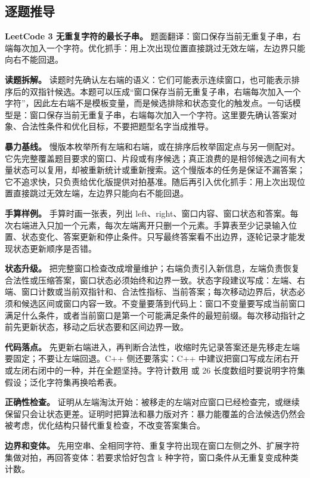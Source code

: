 \subsection{逐题推导}

\noindent\textbf{LeetCode 3 无重复字符的最长子串。} 题面翻译：窗口保存当前无重复子串，右端每次加入一个字符。优化抓手：用上次出现位置直接跳过无效左端，左边界只能向右不能回退。

\textbf{读题拆解。} 读题时先确认左右端的语义：它们可能表示连续窗口，也可能表示排序后的双指针候选。本题可以压成“窗口保存当前无重复子串，右端每次加入一个字符”，因此左右端不是模板变量，而是候选排除和状态变化的触发点。一句话模型是：窗口保存当前无重复子串，右端每次加入一个字符。这里要先确认答案对象、合法性条件和优化目标，不要把题型名字当成推导。

\textbf{暴力基线。} 慢版本枚举所有左端和右端，或在排序后枚举固定点与另一侧配对。它先完整覆盖题目要求的窗口、片段或有序候选；真正浪费的是相邻候选之间有大量状态可以复用，却被重新统计或重新搜索。这个慢版本的任务是保证不漏答案；它不追求快，只负责给优化版提供对拍基准。随后再引入优化抓手：用上次出现位置直接跳过无效左端，左边界只能向右不能回退。

\textbf{手算样例。} 手算时画一张表，列出 left、right、窗口内容、窗口状态和答案。每次右端进入只加一个元素，每次左端离开只删一个元素。手算表至少记录输入位置、状态变化、答案更新和停止条件。只写最终答案看不出边界，逐轮记录才能发现状态更新顺序是否错。

\textbf{状态升级。} 把完整窗口检查改成增量维护；右端负责引入新信息，左端负责恢复合法性或压缩答案，窗口状态必须始终和边界一致。状态字段建议写成：左端、右端、窗口计数或当前双指针和、合法性指标、当前答案；每次移动边界后，状态必须和候选区间或窗口内容一致。不变量要落到代码上：窗口不变量要写成当前窗口满足什么条件，或者当前窗口是第一个可能满足条件的最短前缀。每次移动指针之前先更新状态，移动之后状态要和区间边界一致。

\textbf{代码落点。} 先更新右端进入，再判断合法性，收缩时先记录答案还是先移走左端要固定；不要让左端回退。C++ 侧还要落实：C++ 中建议把窗口写成左闭右开或左闭右闭中的一种，并在全题坚持。字符计数用  或 26 长度数组时要说明字符集假设；泛化字符集再换哈希表。

\textbf{正确性检查。} 证明从左端淘汰开始：被移走的左端对应窗口已经检查完，或继续保留只会让状态更差。证明时把算法和暴力版对齐：暴力能覆盖的合法候选仍然会被考虑，优化结构只替代重复检查，不改变答案集合。

\textbf{边界和变体。} 先用空串、全相同字符、重复字符出现在窗口左侧之外、扩展字符集做对拍，再回答变体：若要求恰好包含 k 种字符，窗口条件从无重复变成种类计数。

